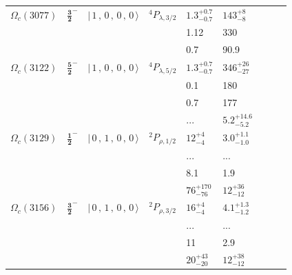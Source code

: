\documentclass[11pt]{article}
\begin{document}
\begin{table}[htbp]
{\begin{tabular}{c c c c  p{1.0cm}  p{1.0cm}  p{1.0cm}  p{1.0cm}  p{1.0cm}}
$\Omega_c(3077)$  & $ \mathbf{\frac{3}{2}^-}$ & $\vert \,1\,,\,0\,,\,0\,,\,0 \,\rangle $ &$^{4}P_{\lambda,3/2}$&$ 1.3 _{- 0.7 }^{+ 0.7 }$    &  $ 143 _{- 8 }^{+ 8 }$   \\
 & &  &  & 1.12 & 330 &  \\
 & &  &   & 0.7 & 90.9 &  \\
$\Omega_c(3122)$  & $ \mathbf{\frac{5}{2}^-}$ & $\vert \,1\,,\,0\,,\,0\,,\,0 \,\rangle $ &$^{4}P_{\lambda,5/2}$&$ 1.3 _{- 0.7 }^{+ 0.7 }$    &  $ 346 _{- 27 }^{+ 26 }$   \\
 & &  &   & 0.1 & 180 &  \\
 & &  &   & 0.7 & 177 &  \\
 & &  &   & ... & $5.2^{+14.6}_{-5.2}$ &  \\
$\Omega_c(3129)$  & $ \mathbf{\frac{1}{2}^-}$ & $\vert \,0\,,\,1\,,\,0\,,\,0 \,\rangle $ &$^{2}P_{\rho,1/2}$&$ 12 _{- 4 }^{+ 4 }$    &  $ 3.0 _{- 1.0 }^{+ 1.1 }$   \\
 & &  &   & ... & ... &  \\
 & &  &   & 8.1 & 1.9 &  \\
 & &  &  & $76^{+170}_{-76}$ & $12^{+36}_{-12}$ &  \\
$\Omega_c(3156)$  & $ \mathbf{\frac{3}{2}^-}$ & $\vert \,0\,,\,1\,,\,0\,,\,0 \,\rangle $ &$^{2}P_{\rho,3/2}$&$ 16 _{- 4 }^{+ 4 }$    &  $ 4.1 _{- 1.2 }^{+ 1.3 }$   \\
 & &  &   & ... & ... &  \\
 & &  &   & 11 & 2.9 &  \\
 & &  &  & $20^{+43}_{-20}$ & $12^{+38}_{-12}$ &  \\
\hline \hline
\end{tabular}
}
\end{table}
\end{document}
